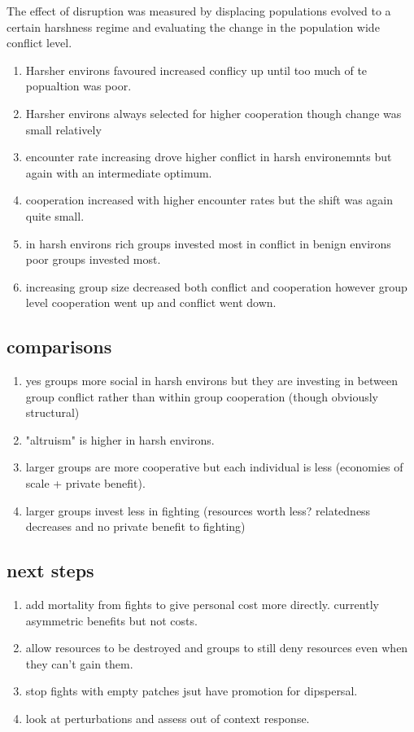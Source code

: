 The effect of disruption was measured by displacing populations evolved to a certain harshness regime and evaluating the change in the population wide conflict level. 


\begin{enumerate}
    \item Harsher environs favoured increased conflicy up until too much of te popualtion was poor.
    \item Harsher environs always selected for higher cooperation though change was small relatively 
    \item encounter rate increasing drove higher conflict in harsh environemnts but again with an intermediate optimum. 
    \item cooperation increased with higher encounter rates but the shift was again quite small.
    \item in harsh environs rich groups invested most in conflict in benign environs poor groups invested most. 
    \item increasing group size decreased both conflict and cooperation however group level cooperation went up and conflict went down. 
\end{enumerate}

\subsection{comparisons} 
\begin{enumerate}
    \item yes groups more social in harsh environs but they are investing in between group conflict rather than within group cooperation (though obviously structural)
    \item "altruism" is higher in harsh environs.
    \item larger groups are more cooperative but each individual is less (economies of scale + private benefit).
    \item larger groups invest less in fighting (resources worth less? relatedness decreases and no private benefit to fighting)
\end{enumerate}

\subsection{next steps}
\begin{enumerate}
    \item add mortality from fights to give personal cost more directly. currently asymmetric benefits but not costs.
    \item allow resources to be destroyed and groups to still deny resources even when they can't gain them.
    \item stop fights with empty patches jsut have promotion for dipspersal.
    \item look at perturbations and assess out of context response. 
\end{enumerate}